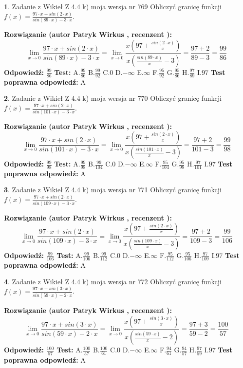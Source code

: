 \documentclass[12pt, a4paper]{article}
\theoremstyle{definition} %
\newtheorem{zad}{}
\newcommand{\zadStart}[1]{\begin{zad}#1\newline}
\newcommand{\zadStop}{\end{zad}}
\newcommand{\rozwStart}[2]{\noindent \textbf{Rozwiązanie (autor #1 , recenzent #2): }\newline}
\newcommand{\rozwStop}{\newline}
\newcommand{\odpStart}{\noindent \textbf{Odpowiedź:}\newline}
\newcommand{\odpStop}{\newline}
\newcommand{\testStart}{\noindent \textbf{Test:}\newline}
\newcommand{\testStop}{\newline}
\newcommand{\kluczStart}{\noindent \textbf{Test poprawna odpowiedź:}\newline}
\newcommand{\kluczStop}{\newline}
\begin{document}
\zadStart{Zadanie z Wikieł Z 4.4 k) moja wersja nr 769}
Obliczyć granicę funkcji $f(x)=\frac{97\cdot x +sin(2\cdot x)}{sin(89\cdot x) -3\cdot x}$.
\zadStop
\rozwStart{Patryk Wirkus}{}
$$\lim\limits_{x\to 0}\frac{97\cdot x +sin(2\cdot x)}{sin(89\cdot x) -3\cdot x}
=\lim\limits_{x\to 0}\frac{x(97+\frac{sin(2\cdot x)}{x})}{x(\frac{sin(89\cdot x)}{x}-3)}
=\frac{97+2}{89-3} = \frac{99}{86}$$
\rozwStop
\odpStart
$\frac{99}{86}$
\odpStop
\testStart
A.$\frac{99}{86}$
B.$\frac{99}{92}$
C.$0$
D.$-\infty$
E.$\infty$
F.$\frac{95}{92}$
G.$\frac{95}{86}$
H.$\frac{97}{89}$
I.$97$
\testStop
\kluczStart
A
\kluczStop



\zadStart{Zadanie z Wikieł Z 4.4 k) moja wersja nr 770}
Obliczyć granicę funkcji $f(x)=\frac{97\cdot x +sin(2\cdot x)}{sin(101\cdot x) -3\cdot x}$.
\zadStop
\rozwStart{Patryk Wirkus}{}
$$\lim\limits_{x\to 0}\frac{97\cdot x +sin(2\cdot x)}{sin(101\cdot x) -3\cdot x}
=\lim\limits_{x\to 0}\frac{x(97+\frac{sin(2\cdot x)}{x})}{x(\frac{sin(101\cdot x)}{x}-3)}
=\frac{97+2}{101-3} = \frac{99}{98}$$
\rozwStop
\odpStart
$\frac{99}{98}$
\odpStop
\testStart
A.$\frac{99}{98}$
B.$\frac{99}{104}$
C.$0$
D.$-\infty$
E.$\infty$
F.$\frac{95}{104}$
G.$\frac{95}{98}$
H.$\frac{97}{101}$
I.$97$
\testStop
\kluczStart
A
\kluczStop



\zadStart{Zadanie z Wikieł Z 4.4 k) moja wersja nr 771}
Obliczyć granicę funkcji $f(x)=\frac{97\cdot x +sin(2\cdot x)}{sin(109\cdot x) -3\cdot x}$.
\zadStop
\rozwStart{Patryk Wirkus}{}
$$\lim\limits_{x\to 0}\frac{97\cdot x +sin(2\cdot x)}{sin(109\cdot x) -3\cdot x}
=\lim\limits_{x\to 0}\frac{x(97+\frac{sin(2\cdot x)}{x})}{x(\frac{sin(109\cdot x)}{x}-3)}
=\frac{97+2}{109-3} = \frac{99}{106}$$
\rozwStop
\odpStart
$\frac{99}{106}$
\odpStop
\testStart
A.$\frac{99}{106}$
B.$\frac{99}{112}$
C.$0$
D.$-\infty$
E.$\infty$
F.$\frac{95}{112}$
G.$\frac{95}{106}$
H.$\frac{97}{109}$
I.$97$
\testStop
\kluczStart
A
\kluczStop



\zadStart{Zadanie z Wikieł Z 4.4 k) moja wersja nr 772}
Obliczyć granicę funkcji $f(x)=\frac{97\cdot x +sin(3\cdot x)}{sin(59\cdot x) -2\cdot x}$.
\zadStop
\rozwStart{Patryk Wirkus}{}
$$\lim\limits_{x\to 0}\frac{97\cdot x +sin(3\cdot x)}{sin(59\cdot x) -2\cdot x}
=\lim\limits_{x\to 0}\frac{x(97+\frac{sin(3\cdot x)}{x})}{x(\frac{sin(59\cdot x)}{x}-2)}
=\frac{97+3}{59-2} = \frac{100}{57}$$
\rozwStop
\odpStart
$\frac{100}{57}$
\odpStop
\testStart
A.$\frac{100}{57}$
B.$\frac{100}{61}$
C.$0$
D.$-\infty$
E.$\infty$
F.$\frac{94}{61}$
G.$\frac{94}{57}$
H.$\frac{97}{59}$
I.$97$
\testStop
\kluczStart
A
\kluczStop
\end{document}

